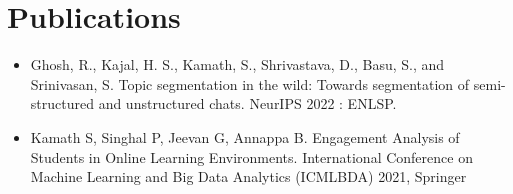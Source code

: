 \documentclass{article}
\begin{document}
\section{Publications}
\begin{itemize}
\item Ghosh, R., Kajal, H. S., Kamath, S., Shrivastava, D., Basu, S., and Srinivasan, S. Topic segmentation in the wild: Towards segmentation of semi-structured and unstructured chats. NeurIPS 2022 : ENLSP. 
\item Kamath S, Singhal P, Jeevan G, Annappa B. Engagement Analysis of Students in Online Learning Environments. International Conference on Machine Learning and Big Data Analytics (ICMLBDA) 2021, Springer 

\end{itemize}




\end{document}

